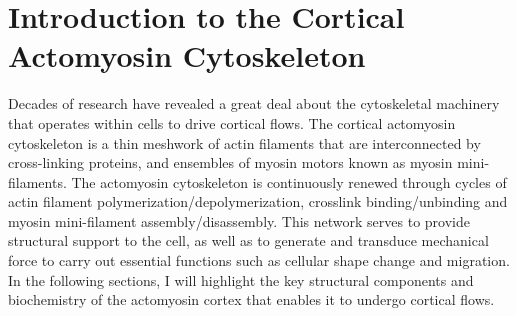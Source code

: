 \section{Introduction to the Cortical Actomyosin Cytoskeleton}
\label{sec:basic}
Decades of research have revealed a great deal about the cytoskeletal machinery that operates within cells to  drive cortical flows. The cortical actomyosin cytoskeleton is a thin meshwork of actin filaments that are interconnected by cross-linking proteins, and ensembles of myosin motors known as myosin mini-filaments\cite{Alberts}.  The actomyosin cytoskeleton is continuously renewed through cycles of actin filament polymerization/depolymerization, crosslink binding/unbinding and myosin mini-filament assembly/disassembly\cite{phys_bio_cell}. This network serves to provide structural support to the cell, as well as to generate and transduce mechanical force to carry out essential functions such as cellular shape change and migration.  In the following sections, I will highlight the key structural components and biochemistry of the actomyosin cortex that enables it to undergo cortical flows.

